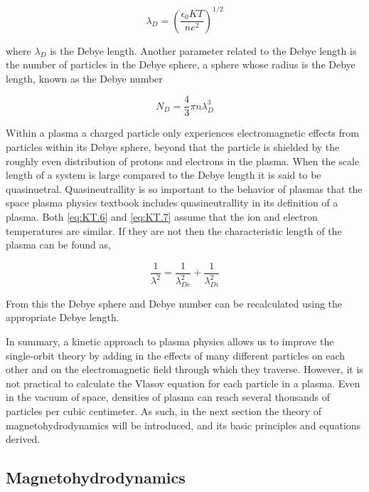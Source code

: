 \documentclass[utf8]{report}
\begin{document}
\begin{equation}
    \lambda_{D} = (\frac{\epsilon_{0} KT}{n e^{2}})^{1/2}
    \label{eq:KT.6}
\end{equation}

where $\lambda_{D}$ is the Debye length. Another parameter related to the Debye length is the number of particles in the Debye sphere, a sphere whose radius is the Debye length, known as the Debye number

\begin{equation}
    N_{D} = \frac{4}{3} \pi n \lambda^{3}_{D}
    \label{eq:KT.7}
\end{equation}

Within a plasma a charged particle only experiences electromagnetic effects from particles within its Debye sphere, beyond that the particle is shielded by the roughly even distribution of protons and electrons in the plasma. When the scale length of a system is large compared to the Debye length it is said to be quasinuetral. Quasineutrallity is so important to the behavior of plasmas that the space plasma physics textbook \cite{Rycroft1998BasicSP} %
includes quasineutrallity in its definition of a plasma. Both \ref{eq:KT.6} and \ref{eq:KT.7} assume that the ion and electron temperatures are similar. If they are not then the characteristic length of the plasma can be found as, 

\begin{equation}
    \frac{1}{\lambda^{2}} = \frac{1}{\lambda^{2}_{De}} + \frac{1}{\lambda^{2}_{Di}}
    \label{eq:KT.8}
\end{equation}
    


From this the Debye sphere and Debye number can be recalculated using the appropriate Debye length. 

In summary, a kinetic approach to plasma physics allows us to improve the single-orbit theory by adding in the effects of many different particles on each other and on the electromagnetic field through which they traverse. However, it is not practical to calculate the Vlasov equation for each particle in a plasma. Even in the vacuum of space, densities of plasma can reach several thousands of particles per cubic centimeter. As such, in the next section the theory of magnetohydrodynamics will be introduced, and its basic principles and equations derived. 

\subsection{Magnetohydrodynamics}
\end{document}
